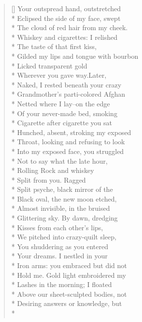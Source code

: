 \label{ch:desire}
\settowidth{\versewidth}{The searing, distant god?      And if you}
\begin{verse}[\versewidth]
Your outspread hand, outstretched\\*
Eclipsed the side of my face, swept\\*
The cloud of red hair from my cheek.\\*
Whiskey and cigarettes: I relished\\*
The taste of that first kiss,\\*
Gilded my lips and tongue with bourbon\\*
Licked transparent gold\\*
Wherever you gave way.\qquad Later,\\*
Naked, I rested beneath your crazy\\*
Grandmother's parti-colored Afghan\\*
Netted where I lay--on the edge\\*
Of your never-made bed, smoking\\*
Cigarette after cigarette you sat\\*
Hunched, absent, stroking my exposed\\*
Throat, looking and refusing to look\\*
Into my exposed face, you struggled\\*
Not to say what the late hour,\\*
Rolling Rock and whiskey\\*
Split from you. Ragged\\*
Split psyche, black mirror of the\\*
Black oval, the new moon etched,\\*
Almost invisible, in the bruised\\*
Glittering sky. By dawn, dredging\\*
Kisses from each other's lips,\\*
We pitched into crazy-quilt sleep,\\*
You shuddering as you entered\\*
Your dreams. I nestled in your\\*
Iron arms: you embraced but did not\\*
Hold me. Gold light embroidered my\\*
Lashes in the morning; I floated\\*
Above our sheet-sculpted bodies, not\\*
Desiring answers or knowledge, but\\*

\end{verse}
